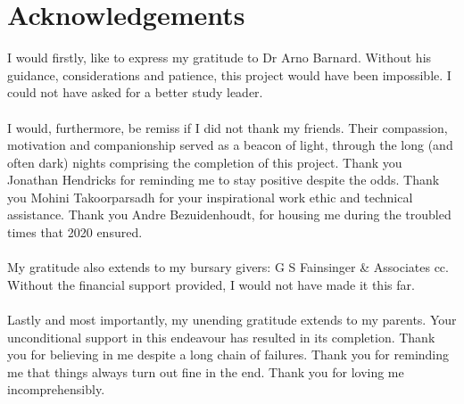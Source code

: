 \chapter*{Acknowledgements}
\label{ack}

I would firstly, like to express my gratitude to Dr Arno Barnard. Without his guidance, considerations and patience, this project would have been impossible. I could not have asked for a better study leader.
\\\\
I would, furthermore, be remiss if I did not thank my friends. Their compassion, motivation and companionship served as a beacon of light, through the long (and often dark) nights comprising the completion of this project. Thank you Jonathan Hendricks for reminding me to stay positive despite the odds. Thank you Mohini Takoorparsadh for your inspirational work ethic and technical assistance. Thank you Andre Bezuidenhoudt, for housing me during the troubled times that 2020 ensured.
\\\\
My gratitude also extends to my bursary givers: G S Fainsinger \& Associates cc. Without the financial support provided, I would not have made it this far.
\\\\
Lastly and most importantly, my unending gratitude extends to my parents. Your unconditional support in this endeavour has resulted in its completion. Thank you for believing in me despite a long chain of failures. Thank you for reminding me that things always turn out fine in the end. Thank you for loving me incomprehensibly.